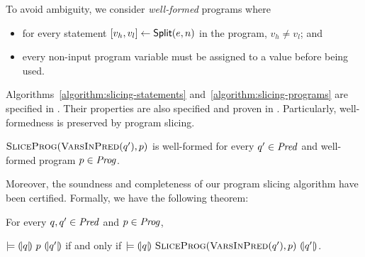 To avoid ambiguity, we consider \emph{well-formed} programs where
\begin{itemize}
\item for every statement ${[}{v_h}, {v_l}{]} \leftarrow
  \mbox{\textsf{Split}}(e, n)$ in the program, $v_h \neq v_l$; and
\item every non-input program variable must be assigned to a value
  before being used. 
\end{itemize}
Algorithms~\ref{algorithm:slicing-statements}
and~\ref{algorithm:slicing-programs} are specified in \gallina. Their
properties are also specified and proven in \coq. 
Particularly, well-formedness is preserved by program slicing.
\begin{lemma}
  $\textsc{SliceProg}(\textsc{VarsInPred}(q'), p)$ is well-formed
  for every $q' \in \mathit{Pred}$ and well-formed program $p \in \mathit{Prog}$.
  \label{lemma:slicing-well-formed}
\end{lemma}

Moreover, the
soundness and completeness of our program slicing algorithm have been
certified. Formally, we have the following theorem:

\begin{theorem}
  For every $q, q' \in \mathit{Pred}$ and $p \in \mathit{Prog}$,
  \begin{center}
  $\models {(\!|}{q}{|\!)}~{p}~{(\!|}{q'}{|\!)}$ if and only if
  $\models {(\!|}{q}{|\!)}~{\textsc{SliceProg}(\textsc{VarsInPred}(q'), p)}~{(\!|}{q'}{|\!)}$.
  \end{center}
  \label{theorem:program-slicing}
\end{theorem}